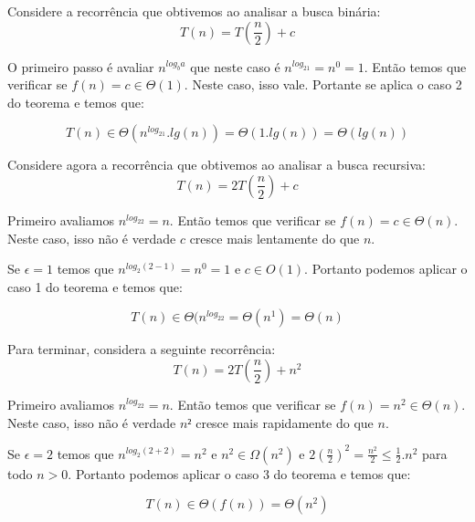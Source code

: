 \begin{example}
  Considere a recorrência que obtivemos ao analisar a busca binária:
  \begin{displaymath}
    T(n) = T\left(\frac{n}{2}\right) + c
  \end{displaymath}

  O primeiro passo é avaliar $n^{log_ba}$ que neste caso é $n^{log_21} = n^0 = 1$.
  Então temos que verificar se $f(n) = c \in \Theta(1)$.
  Neste caso, isso vale.
  Portante se aplica o caso 2 do teorema e temos que:

  \begin{displaymath}
    T(n) \in \Theta(n^{log_21}.lg(n)) = \Theta(1.lg(n)) = \Theta(lg(n))
  \end{displaymath}
\end{example}


\begin{example}
  Considere agora a recorrência que obtivemos ao analisar a busca recursiva:
  \begin{displaymath}
    T(n) = 2T\left(\frac{n}{2}\right) + c
  \end{displaymath}

  Primeiro avaliamos $n^{log_22} = n$.
  Então temos que verificar se $f(n) = c \in \Theta(n)$.
  Neste caso, isso não é verdade $c$ cresce mais lentamente do que $n$.
  
  Se  $\epsilon = 1$ temos que $n^{log_2(2-1)} = n^0 = 1$ e $c \in O(1)$.
  Portanto podemos aplicar o caso 1 do teorema e temos que:

  \begin{displaymath}
    T(n) \in \Theta(n^{log_22} = \Theta(n^1) = \Theta(n)
  \end{displaymath}
\end{example}

\begin{example}
  Para terminar, considera a seguinte recorrência:
  \begin{displaymath}
    T(n) = 2T\left(\frac{n}{2}\right) + n^2
  \end{displaymath}

  Primeiro avaliamos $n^{log_22} = n$.
  Então temos que verificar se $f(n) = n^2 \in \Theta(n)$.
  Neste caso, isso não é verdade $n²$ cresce mais rapidamente do que $n$.
  
  Se $\epsilon = 2$ temos que $n^{log_2(2+2)} = n^2$ e $n^2 \in \Omega(n^2)$ e $2(\frac{n}{2})^2 = \frac{n^2}{2} \leq \frac{1}{2}.n^2$ para todo $n > 0$.  
  Portanto podemos aplicar o caso 3 do teorema e temos que:

  \begin{displaymath}
    T(n) \in \Theta(f(n)) = \Theta(n^2)
  \end{displaymath}
\end{example}


